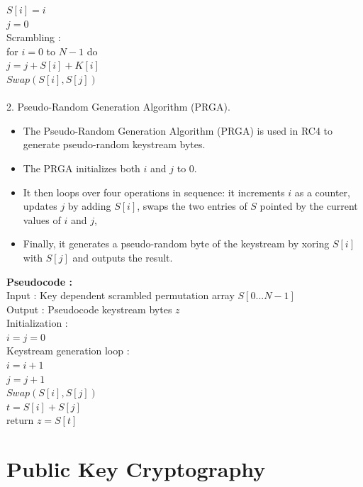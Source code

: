 \documentclass[11pt]{article}
\begin{document}
\hspace*{0.5cm} $S[i] = i$ \\
\hspace*{0.5cm} $j = 0$ \\
Scrambling : \\
for $i=0$ to $N-1$ do \\
\hspace*{0.5cm} $j = j + S[i] + K[i]$ \\
\hspace*{0.5cm} $Swap(S[i],S[j])$ \\
\\
2. Pseudo-Random Generation Algorithm (PRGA).
\begin{itemize}
\itemsep 0em
\item The Pseudo-Random Generation Algorithm (PRGA) is used in RC4 to generate pseudo-random keystream bytes.
\item The PRGA initializes both $i$ and $j$ to 0.
\item It then loops over four operations in sequence: it increments $i$ as a counter, updates $j$ by adding $S[i]$, swaps the two entries of $S$ pointed by the current values of $i$ and $j$,
\item Finally, it generates a pseudo-random byte of the keystream by xoring $S[i]$ with $S[j]$ and outputs the result.
\end{itemize}
\textbf{Pseudocode :}\\
Input : Key dependent scrambled permutation array $S[0...N-1]$ \\
Output : Pseudocode keystream bytes $z$\\
Initialization : \\
$i = j = 0$ \\
Keystream generation loop : \\
$i = i+1$\\ 
$j = j+1$\\
$Swap(S[i],S[j])$\\
$t = S[i] + S[j]$\\
return $z = S[t]$ 

\section*{Public Key Cryptography}
\end{document}
